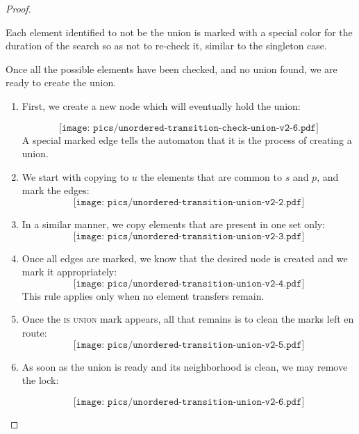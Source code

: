 \documentclass[submission,copyright,creativecommons,english]{eptcs}
\begin{document}
\begin{proof}
\begin{enumerate}
{Each element identified to not be the union is marked with a special color  for the duration of the search so as not to re-check it, similar to the singleton case.}

\end{enumerate}

{Once all the possible elements have been checked, and no union found, 
 we are ready to create the union.}

\begin{enumerate}
\item {First, we create a new node which will eventually hold the union:}

\[\texttt{[image: pics/unordered-transition-check-union-v2-6.pdf]}\]
{A special marked edge  tells the automaton that it is the process  of creating a union.}

\item We start with  copying   to $u$ the elements that are common to $s$ and $p$, {and mark the edges}:
\[\texttt{[image: pics/unordered-transition-union-v2-2.pdf]}\]

\item In a similar manner, we copy elements that are present in one set only:
\[\texttt{[image: pics/unordered-transition-union-v2-3.pdf]}\]

\item Once all edges are marked, we know that the desired node is created and we mark it appropriately:
\[\texttt{[image: pics/unordered-transition-union-v2-4.pdf]}\]
This rule applies only when no element transfers remain.

\item {Once the \textsc{is union} mark appears, all that remains is to clean the marks left en route:}
\[\texttt{[image: pics/unordered-transition-union-v2-5.pdf]}\]

 
 \item As soon as the union is ready and its neighborhood is clean, we may remove the lock:
 
 \[\texttt{[image: pics/unordered-transition-union-v2-6.pdf]}\]

 
 \end{enumerate}


\end{proof}
\end{document}
